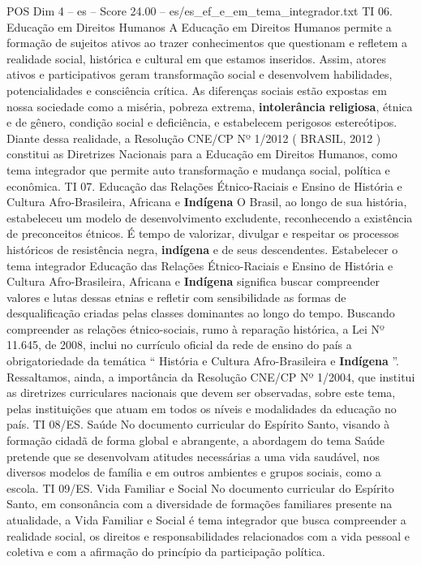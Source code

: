 \begin{textsample}{POS Dim 4 – es – Score 24.00 – es/es\_ef\_e\_em\_tema\_integrador.txt}
TI 06.
Educação em Direitos Humanos A Educação em Direitos Humanos permite a formação de sujeitos ativos ao trazer conhecimentos que questionam e refletem a realidade social, histórica e cultural em que estamos inseridos.
Assim, atores ativos e participativos geram transformação social e desenvolvem habilidades, potencialidades e consciência crítica.
As diferenças sociais estão expostas em nossa sociedade como a miséria, pobreza extrema, \textbf{intolerância} \textbf{religiosa}, étnica e de gênero, condição social e deficiência, e estabelecem perigosos estereótipos.
Diante dessa realidade, a Resolução CNE/CP Nº 1/2012 ( BRASIL, 2012 ) constitui as Diretrizes Nacionais para a Educação em Direitos Humanos, como tema integrador que permite auto transformação e mudança social, política e econômica.
TI 07.
Educação das Relações Étnico-Raciais e Ensino de História e Cultura Afro-Brasileira, Africana e \textbf{Indígena} O Brasil, ao longo de sua história, estabeleceu um modelo de desenvolvimento excludente, reconhecendo a existência de preconceitos étnicos.
É tempo de valorizar, divulgar e respeitar os processos históricos de resistência negra, \textbf{indígena} e de seus descendentes.
Estabelecer o tema integrador Educação das Relações Étnico-Raciais e Ensino de História e Cultura Afro-Brasileira, Africana e \textbf{Indígena} significa buscar compreender valores e lutas dessas etnias e refletir com sensibilidade as formas de desqualificação criadas pelas classes dominantes ao longo do tempo.
Buscando compreender as relações étnico-sociais, rumo à reparação histórica, a Lei Nº 11.645, de 2008, inclui no currículo oficial da rede de ensino do país a obrigatoriedade da temática “ História e Cultura Afro-Brasileira e \textbf{Indígena} ”.
Ressaltamos, ainda, a importância da Resolução CNE/CP Nº 1/2004, que institui as diretrizes curriculares nacionais que devem ser observadas, sobre este tema, pelas instituições que atuam em todos os níveis e modalidades da educação no país.
TI 08/ES.
Saúde No documento curricular do Espírito Santo, visando à formação cidadã de forma global e abrangente, a abordagem do tema Saúde pretende que se desenvolvam atitudes necessárias a uma vida saudável, nos diversos modelos de família e em outros ambientes e grupos sociais, como a escola.
TI 09/ES.
Vida Familiar e Social No documento curricular do Espírito Santo, em consonância com a diversidade de formações familiares presente na atualidade, a Vida Familiar e Social é tema integrador que busca compreender a realidade social, os direitos e responsabilidades relacionados com a vida pessoal e coletiva e com a afirmação do princípio da participação política.

\end{textsample}
